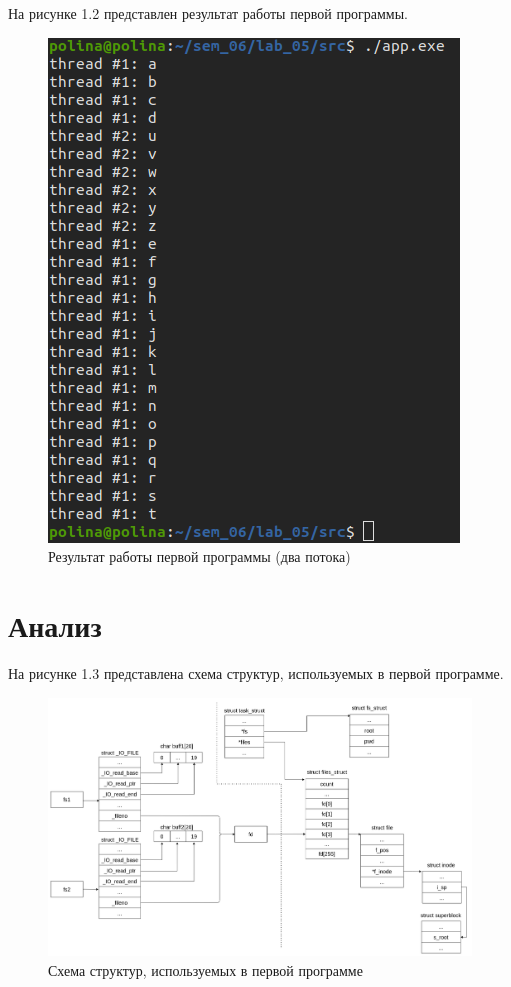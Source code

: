 \documentclass[12pt,a4paper]{scrreprt}
\begin{document}
На рисунке 1.2 представлен результат работы первой программы.

\begin{figure}[H]
	\centering
	\includegraphics[scale=1]{pics/1_2.png}
	\caption{Результат работы первой программы (два потока)}
\end{figure}

\section{Анализ}

На рисунке 1.3 представлена схема структур, используемых в первой программе.

\begin{figure}[H]
	\centering
	\includegraphics[scale=0.32]{pics/d1.png}
	\caption{Схема структур, используемых в первой программе}
\end{figure}
\end{document}
